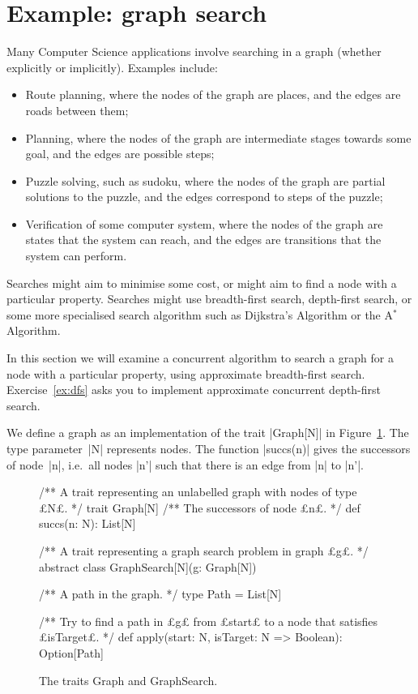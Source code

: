 \section{Example: graph search}

Many Computer Science applications involve searching in a graph (whether
explicitly or implicitly).  Examples include:
%
\begin{itemize}
\item Route planning, where the nodes of the graph are places, and the edges
  are roads between them;

\item Planning, where the nodes of the graph are intermediate stages towards
  some goal, and the edges are possible steps;

\item Puzzle solving, such as sudoku, where the nodes of the graph are partial
  solutions to the puzzle, and the edges correspond to steps of the puzzle;

\item Verification of some computer system, where the nodes of the graph are
  states that the system can reach, and the edges are transitions that the
  system can perform.  
\end{itemize}
%
Searches might aim to minimise some cost, or might aim to find a node with a
particular property.  Searches might use breadth-first search, depth-first
search, or some more specialised search algorithm such as Dijkstra's Algorithm
or the A$^*$ Algorithm.

In this section we will examine a concurrent algorithm to search a graph for a
node with a particular property, using approximate breadth-first search.
Exercise~\ref{ex:dfs} asks you to implement approximate concurrent
depth-first search.

We define a graph as an implementation of the trait |Graph[N]| in
Figure~\ref{fig:graph}.  The type parameter~|N| represents nodes.  The
function |succs(n)| gives the successors of node~|n|, i.e.~all nodes |n'| such
that there is an edge from |n| to |n'|.


\begin{figure}
\begin{scala}
/** A trait representing an unlabelled graph with nodes of type £N£. */
trait Graph[N]{
  /** The successors of node £n£. */
  def succs(n: N): List[N]
}

/** A trait representing a graph search problem in graph £g£. */
abstract class GraphSearch[N](g: Graph[N]){
  /** A path in the graph. */
  type Path = List[N]

  /** Try to find a path in £g£ from £start£ to a node that satisfies £isTarget£. */
  def apply(start: N, isTarget: N => Boolean): Option[Path]
}
\end{scala}
\caption{The traits {\scalashape Graph} and {\scalashape GraphSearch}.}
\label{fig:graph}
\end{figure}

